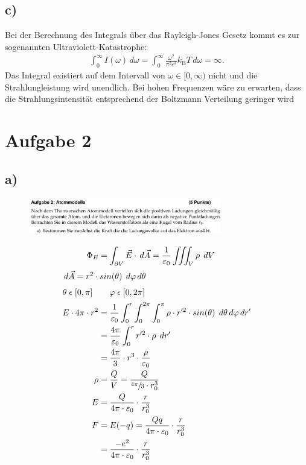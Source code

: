 \subsection{c)}

Bei der Berechnung des Integrals über das Rayleigh-Jones Gesetz kommt es zur sogenannten Ultraviolett-Katastrophe:
\begin{align*}
    \int_0^{\infty} I(\omega)\, d \omega=\int_0^{\infty} \frac{\omega ^2}{\pi ^2 c^3} k_{\text{B}} T \, d \omega = \infty .
\end{align*}
Das Integral existiert auf dem Intervall von $\omega \in [0, \infty) $ nicht und die Strahlungleistung wird unendlich.
Bei hohen Frequenzen wäre  zu erwarten, dass die Strahlungsintensität entsprechend der Boltzmann Verteilung geringer wird

\section{Aufgabe 2}

\subsection{a)}

\begin{figure}[H]
    \centering
    \includegraphics[width=0.75\textwidth]{images/Aufgabe_2a.jpg}
    \label{fig:5}
\end{figure}

    \begin{align}
        \Phi_E &= \int_{\partial V} \vec{E} \cdot \,d\vec{A} = \frac{1}{\varepsilon_0} \iiint_{V} \rho \; \,dV\\
        \intertext{$\,d\vec{A} = r^2 \cdot sin(\theta) \; \,d\varphi \,d\theta$
        }
        \intertext{$\theta \; \epsilon \; [0,\pi] \qquad \varphi \; \epsilon \; [0, 2\pi]$
        }
        E \cdot 4\pi \cdot r^2 &= \frac{1}{\varepsilon_0} \int_{0}^{r}\int_{0}^{2\pi}\int_{0}^{\pi} \rho \cdot r'^2 \cdot sin(\theta)\; \,d\theta \,d\varphi \,dr'\\
        &= \frac{4\pi}{\varepsilon_0} \int_{0}^{r} r'^2 \cdot \rho \; \,dr'\\
        &= \frac{4\pi}{3} \cdot r^3 \cdot \frac{\rho}{\varepsilon_0}\\
        \rho &= \frac{Q}{V} = \frac{Q}{\sfrac{4\pi}{3} \cdot r_0^3}\\
        E &= \frac{Q}{4\pi \cdot \varepsilon_0} \cdot \frac{r}{r_0^3}\\
        F &= E(-q) = \frac{Qq}{4\pi \cdot \varepsilon_0} \cdot \frac{r}{r_0^3}\\
        &= \frac{-e^2}{4\pi \cdot \varepsilon_0} \cdot \frac{r}{r_0^3}
    \end{align}

